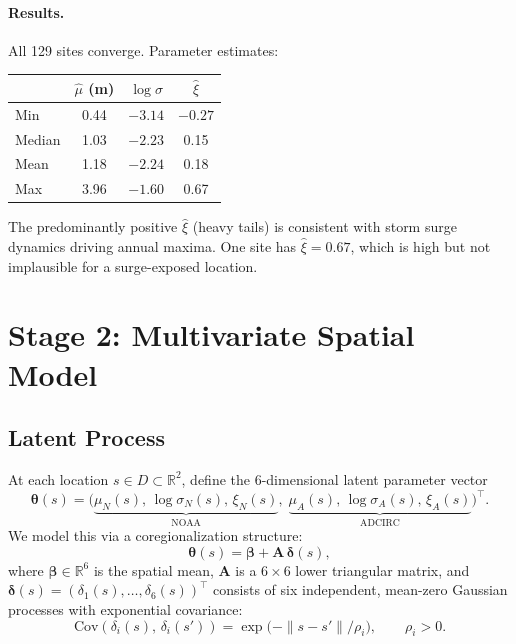 \documentclass[11pt]{article}
\newcommand{\bbR}{\mathbb{R}}
\newcommand{\btheta}{\bm{\theta}}
\newcommand{\bbeta}{\bm{\beta}}
\newcommand{\bdelta}{\bm{\delta}}
\newcommand{\bA}{\mathbf{A}}
\begin{document}
\paragraph{Results.} All 129 sites converge. Parameter estimates:
\begin{center}
\begin{tabular}{@{}lccc@{}}
\toprule
& $\hat{\mu}$ (m) & $\log\hat{\sigma}$ & $\hat{\xi}$ \\
\midrule
Min    & 0.44 & $-3.14$ & $-0.27$ \\
Median & 1.03 & $-2.23$ & 0.15 \\
Mean   & 1.18 & $-2.24$ & 0.18 \\
Max    & 3.96 & $-1.60$ & 0.67 \\
\bottomrule
\end{tabular}
\end{center}
The predominantly positive $\hat{\xi}$ (heavy tails) is consistent with storm surge dynamics driving annual maxima. One site has $\hat{\xi} = 0.67$, which is high but not implausible for a surge-exposed location.

\section{Stage 2: Multivariate Spatial Model}

\subsection{Latent Process}

At each location $s \in D \subset \bbR^2$, define the 6-dimensional latent parameter vector
\[
\btheta(s) = \bigl(\underbrace{\mu_N(s),\, \log\sigma_N(s),\, \xi_N(s)}_{\text{NOAA}},\; \underbrace{\mu_A(s),\, \log\sigma_A(s),\, \xi_A(s)}_{\text{ADCIRC}}\bigr)^\top.
\]
We model this via a coregionalization structure:
\begin{equation}\label{eq:coreg}
\btheta(s) = \bbeta + \bA\,\bdelta(s),
\end{equation}
where $\bbeta \in \bbR^6$ is the spatial mean, $\bA$ is a $6 \times 6$ lower triangular matrix, and $\bdelta(s) = (\delta_1(s), \ldots, \delta_6(s))^\top$ consists of six independent, mean-zero Gaussian processes with exponential covariance:
\[
\text{Cov}(\delta_i(s),\, \delta_i(s')) = \exp\!\bigl(-\|s - s'\| / \rho_i\bigr), \qquad \rho_i > 0.
\]
\end{document}
